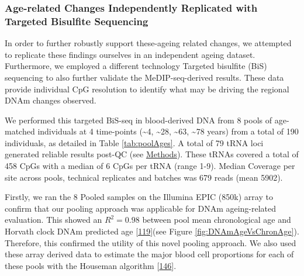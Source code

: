 \documentclass[
]{book}
\begin{document}
\newpage

\hypertarget{age-related-changes-independently-replicated-with-targeted-bisulfite-sequencing}{%
\subsubsection{Age-related Changes Independently Replicated with Targeted Bisulfite Sequencing}\label{age-related-changes-independently-replicated-with-targeted-bisulfite-sequencing}}

In order to further robustly support these-ageing related changes, we attempted to replicate these findings ourselves in an independent ageing dataset.
Furthermore, we employed a different technology Targeted bisulfite (BiS) sequencing to also further validate the MeDIP-seq-derived results.
These data provide individual CpG resolution to identify what may be driving the regional DNAm changes observed.

We performed this targeted BiS-seq in blood-derived DNA from 8 pools of age-matched individuals at 4 time-points (\textasciitilde4, \textasciitilde28, \textasciitilde63, \textasciitilde78 years) from a total of 190 individuals, as detailed in Table \ref{tab:poolAges}.
A total of 79 tRNA loci generated reliable results post-QC (see \protect\hyperlink{targetedBiSseq}{Methods}).
These tRNAs covered a total of 458 CpGs with a median of 6 CpGs per tRNA (range 1-9).
Median Coverage per site across pools, technical replicates and batches was 679 reads (mean 5902).

Firstly, we ran the 8 Pooled samples on the Illumina EPIC (850k) array to confirm that our pooling approach was applicable for DNAm ageing-related evaluation.
This showed an \(R^2 = 0.98\) between pool mean chronological age and Horvath clock DNAm predicted age {[}\protect\hyperlink{ref-Horvath2013}{119}{]}(see Figure \ref{fig:DNAmAgeVsChronAge}).
Therefore, this confirmed the utility of this novel pooling approach.
We also used these array derived data to estimate the major blood cell proportions for each of these pools with the Houseman algorithm {[}\protect\hyperlink{ref-Houseman2012}{146}{]}.
\end{document}
